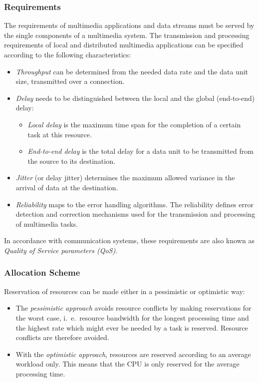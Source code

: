 \subsubsection{Requirements}
The requirements of multimedia applications and data streams must be served by the single components of a multimedia system. The transmission and processing requirements of local and distributed multimedia applications can be specified according to the following characteristics:

\begin{itemize}
	\item \textit{Throughput} can be determined from the needed data rate and the data unit size, transmitted over a connection.
	\item \textit{Delay} needs to be distinguished between the local and the global (end-to-end) delay:
		\begin{itemize}
			\item \textit{Local delay} is the maximum time span for the completion of a certain task at this resource.
			
			\item \textit{End-to-end delay} is the total delay for a data unit to be transmitted from the source to its destination.
		\end{itemize}
	
	\item \textit{Jitter} (or delay jitter) determines the maximum allowed variance in the arrival of data at the destination.
	
	\item \textit{Reliability} maps to the error handling algorithms. The reliability defines error detection and correction mechanisms used for the transmission and processing of multimedia tasks.
\end{itemize}

In accordance with communication systems, these requirements are also known as \textit{Quality of Service parameters (QoS)}.

\subsubsection{Allocation Scheme}
Reservation of resources can be made either in a pessimistic or optimistic way:

\begin{itemize}
	\item The \textit{pessimistic approach} avoids resource conflicts by making reservations for the worst case, i.\ e.\ resource bandwidth for the longest processing time and the highest rate which might ever be needed by a task is reserved. Resource conflicts are therefore avoided.
	
	\item With the \textit{optimistic approach}, resources are reserved according to an	average workload only. This means that the CPU is only reserved for the average processing time.
\end{itemize}

